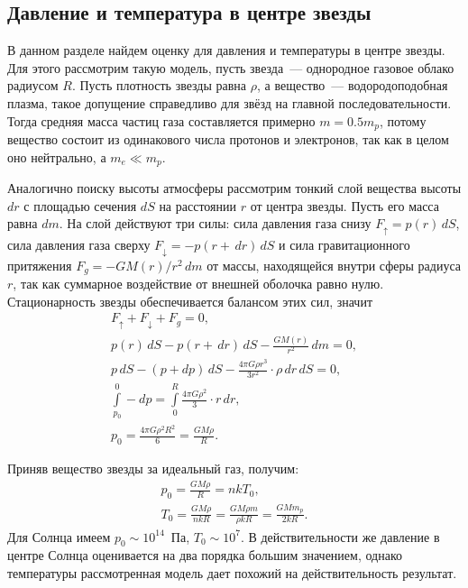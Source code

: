 \subsection{Давление и температура в центре звезды}
В данном разделе найдем оценку для давления и температуры в центре звезды. Для этого рассмотрим такую модель, пусть звезда~--- однородное газовое облако радиусом $R$. Пусть плотность звезды равна $\rho$, а вещество~--- водородоподобная плазма, такое допущение справедливо для звёзд на главной последовательности. Тогда средняя масса частиц газа составляется примерно $m = 0.5m_p$, потому вещество состоит из одинакового числа протонов и электронов, так как в целом оно нейтрально, а $m_e \ll m_p$.

Аналогично поиску высоты атмосферы рассмотрим тонкий слой вещества высоты $dr$ с площадью сечения $dS$ на расстоянии $r$ от центра звезды. Пусть его масса  равна $dm$. На слой действуют три силы: сила давления газа снизу $F_\uparrow = p(r)\,d S$, сила давления газа сверху $F_\downarrow = -p(r + \,d r)\,d S$ и сила гравитационного притяжения $F_g = -GM(r)/r^2\,d m$ от массы, находящейся внутри сферы радиуса $r$, так как суммарное воздействие от внешней оболочка равно нулю. Стационарность звезды обеспечивается балансом этих сил, значит
\begin{gather*}
    F_\uparrow + F_\downarrow + F_g = 0,\\
    p(r)\,d S - p(r + \,d r)\,d S - \frac{GM(r)}{r^2}\,d m = 0,\\
    p\,d S - (p + dp)\,d S - \frac{4\pi G \rho r^3}{3r^2} \cdot \rho \,d r \,d S = 0,\\
    \int\limits_{p_0}^0 -dp = \int\limits_{0}^R \frac{4\pi G \rho^2}{3} \cdot r\,d r,\\
     p_0 = \frac{4\pi G \rho^2 R^2}{6} = \frac{GM\rho}{R}.
\end{gather*}

Приняв вещество звезды за идеальный газ, получим:
\begin{gather*}
    p_0 = \frac{G M \rho}{R} = n k T_0,\\
    T_0 = \frac{G M \rho}{n k R} = \frac{G M \rho m}{\rho k R} = \frac{G M m_p}{2k R}.
\end{gather*}
Для Солнца имеем $p_0 \sim 10^{14}$~Па, $T_0 \sim 10^7$. В действительности же давление в центре Солнца оценивается на два порядка большим значением, однако температуры рассмотренная модель дает похожий на действительность результат.
